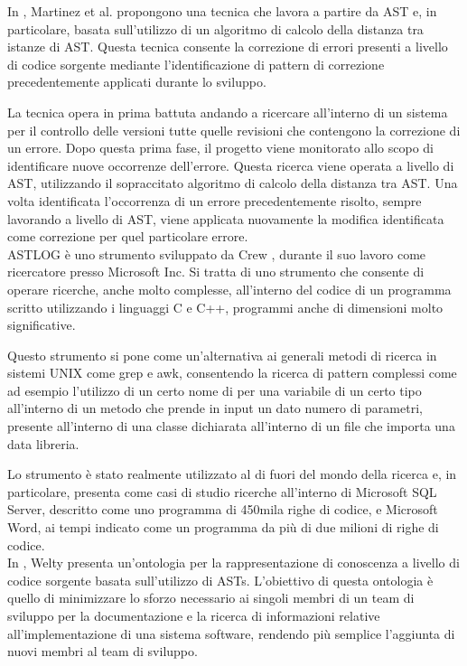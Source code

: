 In \cite{martinez2014accurate}, Martinez et al. propongono una tecnica che
lavora a partire da AST e, in particolare, basata sull’utilizzo di un algoritmo
di calcolo della distanza tra istanze di AST. Questa tecnica consente la
correzione di errori presenti a livello di codice sorgente mediante
l’identificazione di pattern di correzione precedentemente applicati durante lo
sviluppo.

La tecnica opera in prima battuta andando a ricercare all’interno di un sistema
per il controllo delle versioni tutte quelle revisioni che contengono la
correzione di un errore. Dopo questa prima fase, il progetto viene monitorato
allo scopo di identificare nuove occorrenze dell’errore. Questa ricerca viene
operata a livello di AST, utilizzando il sopraccitato algoritmo di calcolo
della distanza tra AST. Una volta identificata l’occorrenza di un errore
precedentemente risolto, sempre lavorando a livello di AST, viene applicata
nuovamente la modifica identificata come correzione per quel particolare
errore.\\

ASTLOG è uno strumento sviluppato da Crew \cite{DBLP:conf/dsl/Crew97}, durante
il suo lavoro come ricercatore presso Microsoft Inc. Si tratta di uno strumento
che consente di operare ricerche, anche molto complesse, all’interno del codice
di un programma scritto utilizzando i linguaggi C e C++, programmi anche di
dimensioni molto significative.

Questo strumento si pone come un’alternativa ai generali metodi di ricerca in
sistemi UNIX come grep e awk, consentendo la ricerca di pattern complessi come
ad esempio l’utilizzo di un certo nome di per una variabile di un certo tipo
all’interno di un metodo che prende in input un dato numero di parametri,
presente all’interno di una classe dichiarata all’interno di un file che
importa una data libreria.

Lo strumento è stato realmente utilizzato al di fuori del mondo della ricerca
e, in particolare, \cite{DBLP:conf/dsl/Crew97} presenta come casi di studio
ricerche all’interno di Microsoft SQL Server, descritto come uno programma di
450mila righe di codice, e Microsoft Word, ai tempi indicato come un programma
da più di due milioni di righe di codice.\\

In \cite{DBLP:conf/kbse/Welty97}, Welty presenta un’ontologia per la
rappresentazione di conoscenza a livello di codice sorgente basata
sull’utilizzo di ASTs. L’obiettivo di questa ontologia è quello di minimizzare
lo sforzo necessario ai singoli membri di un team di sviluppo per la
documentazione e la ricerca di informazioni relative all’implementazione di una
sistema software, rendendo più semplice l’aggiunta di nuovi membri al team di
sviluppo.\\

